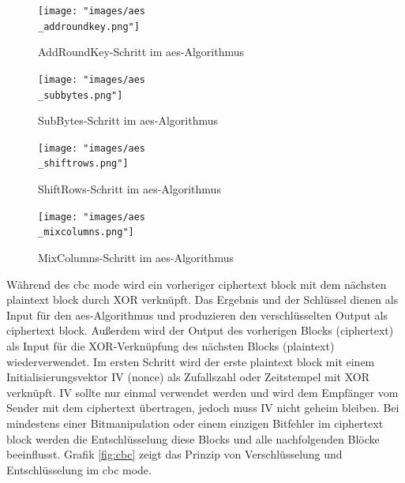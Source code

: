 \begin{figure}[!htb]
	\centering
	\texttt{[image: "images/aes\\\_addroundkey.png"]}
	\caption{AddRoundKey-Schritt im \gls{aes}-Algorithmus \cite{wiki-aes}}
	\label{fig:aes-addk}
\end{figure}

\begin{figure}[!htb]
	\centering
	\texttt{[image: "images/aes\\\_subbytes.png"]}
	\caption{SubBytes-Schritt im \gls{aes}-Algorithmus \cite{wiki-aes}}
	\label{fig:aes-sub}
\end{figure}

\begin{figure}[!htb]
	\centering
	\texttt{[image: "images/aes\\\_shiftrows.png"]}
	\caption{ShiftRows-Schritt im \gls{aes}-Algorithmus \cite{wiki-aes}}
	\label{fig:aes-shift}
\end{figure}

\begin{figure}[!htb]
	\centering
	\texttt{[image: "images/aes\\\_mixcolumns.png"]}
	\caption{MixColumns-Schritt im \gls{aes}-Algorithmus \cite{wiki-aes}}
	\label{fig:aes-mix}
\end{figure}

Während des \gls{cbc} mode wird ein vorheriger ciphertext block mit dem nächsten plaintext block durch XOR verknüpft. Das Ergebnis und der Schlüssel dienen als Input für den \gls{aes}-Algorithmus und produzieren den verschlüsselten Output als ciphertext block. Außerdem wird der Output des vorherigen Blocks (ciphertext) als Input für die XOR-Verknüpfung des nächsten Blocks (plaintext) wiederverwendet. Im ersten Schritt wird der erste plaintext block mit einem Initialisierungsvektor IV (nonce) als Zufallszahl oder Zeitstempel mit XOR verknüpft. IV sollte nur einmal verwendet werden und wird dem Empfänger vom Sender mit dem ciphertext übertragen, jedoch muss IV nicht geheim bleiben. Bei mindestens einer Bitmanipulation oder einem einzigen Bitfehler im ciphertext block werden die Entschlüsselung diese Blocks und alle nachfolgenden Blöcke beeinflusst. \cite{crypto-web} Grafik \ref{fig:cbc} zeigt das Prinzip von Verschlüsselung und Entschlüsselung im \gls{cbc} mode. \\

